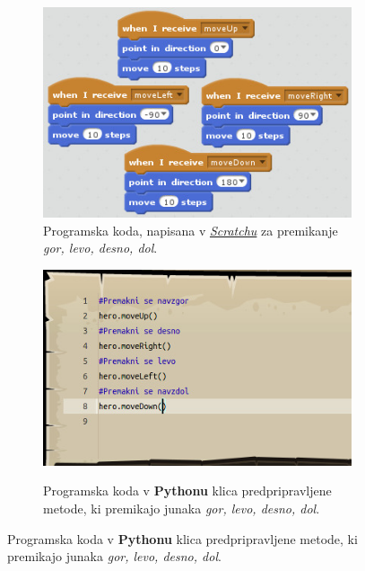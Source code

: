  \begin{figure}[h!]
    \centering
    \begin{subfigure}[]{0.35\textwidth}
      \includegraphics[width=\textwidth]{./images/sc_web/primerjava_scr-premiki-v01.jpg}
      \caption{Programska koda, napisana v
        \emph{\href{https://scratch.mit.edu/}{Scratchu}}
        \cite{web:scratch} za premikanje \emph{gor, levo, desno, dol}.}
        \label{fig:primerjava:scr01}
      \end{subfigure}
      \qquad
    \begin{subfigure}[]{0.35\textwidth}
        \includegraphics[width=\textwidth]{./images/sc_web/primerjava_cc-premiki-v01.jpg}
        \caption{Programska koda v \textbf{Pythonu} klica
          predpripravljene metode, ki premikajo junaka \emph{gor,
            levo, desno, dol}.}
          \cite{web:codecombat}
        \label{fig:primerjava:cc01}
    \end{subfigure}

\end{figure}
